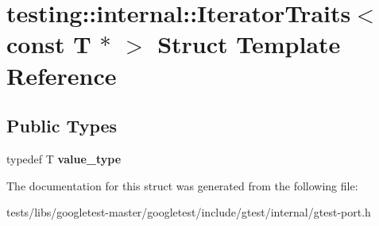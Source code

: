 \hypertarget{structtesting_1_1internal_1_1IteratorTraits_3_01const_01T_01_5_01_4}{}\section{testing\+:\+:internal\+:\+:Iterator\+Traits$<$ const T $\ast$ $>$ Struct Template Reference}
\label{structtesting_1_1internal_1_1IteratorTraits_3_01const_01T_01_5_01_4}
\subsection*{Public Types}
\begin{DoxyCompactItemize}
\item 
\mbox{\label{structtesting_1_1internal_1_1IteratorTraits_3_01const_01T_01_5_01_4_ae7c8867223e106f374b56a7dc4a85547}} 
typedef T {\bfseries value\+\_\+type}
\end{DoxyCompactItemize}


The documentation for this struct was generated from the following file\+:\begin{DoxyCompactItemize}
\item 
tests/libs/googletest-\/master/googletest/include/gtest/internal/gtest-\/port.\+h\end{DoxyCompactItemize}
